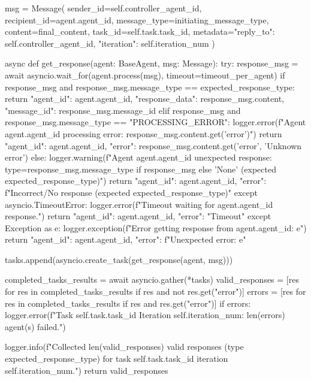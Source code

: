 \documentclass{amsbook}
\theoremstyle{definition}
\theoremstyle{remark}
\numberwithin{equation}{chapter} %
\begin{document}
\begin{python}
             msg = Message(
                 sender_id=self.controller_agent_id,
                 recipient_id=agent.agent_id,
                 message_type=initiating_message_type,
                 content=final_content,
                 task_id=self.task.task_id,
                 metadata={"reply_to": self.controller_agent_id, "iteration": self.iteration_num}
             )

             async def get_response(agent: BaseAgent, msg: Message):
                  try:
                      response_msg = await asyncio.wait_for(agent.process(msg), timeout=timeout_per_agent)
                      if response_msg and response_msg.message_type == expected_response_type:
                          return {"agent_id": agent.agent_id, "response_data": response_msg.content, "message_id": response_msg.message_id}
                      elif response_msg and response_msg.message_type == "PROCESSING_ERROR":
                           logger.error(f"Agent {agent.agent_id} processing error: {response_msg.content.get('error')}")
                           return {"agent_id": agent.agent_id, "error": response_msg.content.get('error', 'Unknown error')}
                      else:
                          logger.warning(f"Agent {agent.agent_id} unexpected response: type={response_msg.message_type if response_msg else 'None'} (expected {expected_response_type})")
                          return {"agent_id": agent.agent_id, "error": f"Incorrect/No response (expected {expected_response_type})"}
                  except asyncio.TimeoutError:
                       logger.error(f"Timeout waiting for {agent.agent_id} response.")
                       return {"agent_id": agent.agent_id, "error": "Timeout"}
                  except Exception as e:
                       logger.exception(f"Error getting response from {agent.agent_id}: {e}")
                       return {"agent_id": agent.agent_id, "error": f"Unexpected error: {e}"}

             tasks.append(asyncio.create_task(get_response(agent, msg)))

        completed_tasks_results = await asyncio.gather(*tasks)
        valid_responses = [res for res in completed_tasks_results if res and not res.get("error")]
        errors = [res for res in completed_tasks_results if res and res.get("error")]
        if errors: logger.error(f"Task {self.task.task_id} Iteration {self.iteration_num}: {len(errors)} agent(s) failed.")

        logger.info(f"Collected {len(valid_responses)} valid responses (type {expected_response_type}) for task {self.task.task_id} iteration {self.iteration_num}.")
        return valid_responses



\end{python}
\end{document}
